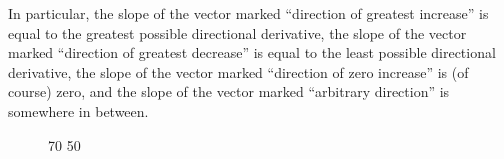 \documentclass{myarticle}
\theoremstyle{nospace}
\newtheorem{old series theorem}{Theorem}
\newenvironment{series theorem}
{\begin{mdframed}\begin{old series theorem}}
    {\end{old series theorem}\end{mdframed}}
\begin{document}
In particular, the slope of the vector marked ``direction of greatest
increase'' is equal to the greatest possible directional derivative,
the slope of the vector marked ``direction of greatest decrease'' is
equal to the least possible directional derivative, the slope of the
vector marked ``direction of zero increase'' is (of course) zero, and
the slope of the vector marked ``arbitrary direction'' is somewhere in
between.

\begin{figure}[htb!] \centering

  \tdplotsetmaincoords
  {70} %
  {50} %


\end{figure}
\end{document}
